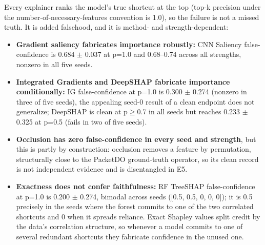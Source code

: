 \documentclass[journal]{IEEEtran}
\providecommand{\tightlist}{\setlength{\itemsep}{0pt}\setlength{\parskip}{0pt}}
\begin{document}
Every explainer ranks the model's true shortcut at the top (top-k
precision under the number-of-necessary-features convention is 1.0), so
the failure is not a missed truth. It is added falsehood, and it is
method- and strength-dependent:

\begin{itemize}
\tightlist
\item
  \textbf{Gradient saliency fabricates importance robustly:} CNN
  Saliency false-confidence is 0.684 $\pm$ 0.037 at p=1.0 and 0.68--0.74
  across all strengths, nonzero in all five seeds.
\item
  \textbf{Integrated Gradients and DeepSHAP fabricate importance
  conditionally:} IG false-confidence at p=1.0 is 0.300 $\pm$ 0.274 (nonzero
  in three of five seeds), the appealing seed-0 result of a clean
  endpoint does not generalize; DeepSHAP is clean at p$\geq$0.7 in all seeds
  but reaches 0.233 $\pm$ 0.325 at p=0.5 (fails in two of five seeds).
\item
  \textbf{Occlusion has zero false-confidence in every seed and
  strength}, but this is partly by construction: occlusion removes a
  feature by permutation, structurally close to the PacketDO
  ground-truth operator, so its clean record is not independent evidence
  and is disentangled in E5.
\item
  \textbf{Exactness does not confer faithfulness:} RF TreeSHAP
  false-confidence at p=1.0 is 0.200 $\pm$ 0.274, bimodal across seeds
  ({[}0.5, 0.5, 0, 0, 0{]}); it is 0.5 precisely in the seeds where the
  forest commits to one of the two correlated shortcuts and 0 when it
  spreads reliance. Exact Shapley values split credit by the data's
  correlation structure, so whenever a model commits to one of several
  redundant shortcuts they fabricate confidence in the unused one.
\end{itemize}
\end{document}
